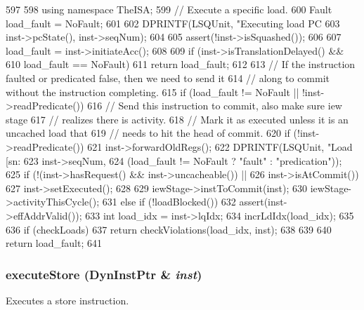 \begin{DoxyCode}
597 {
598     using namespace TheISA;
599     // Execute a specific load.
600     Fault load_fault = NoFault;
601 
602     DPRINTF(LSQUnit, "Executing load PC %
603             inst->pcState(), inst->seqNum);
604 
605     assert(!inst->isSquashed());
606 
607     load_fault = inst->initiateAcc();
608 
609     if (inst->isTranslationDelayed() &&
610         load_fault == NoFault)
611         return load_fault;
612 
613     // If the instruction faulted or predicated false, then we need to send it
614     // along to commit without the instruction completing.
615     if (load_fault != NoFault || !inst->readPredicate()) {
616         // Send this instruction to commit, also make sure iew stage
617         // realizes there is activity.
618         // Mark it as executed unless it is an uncached load that
619         // needs to hit the head of commit.
620         if (!inst->readPredicate())
621             inst->forwardOldRegs();
622         DPRINTF(LSQUnit, "Load [sn:%
623                 inst->seqNum,
624                 (load_fault != NoFault ? "fault" : "predication"));
625         if (!(inst->hasRequest() && inst->uncacheable()) ||
626             inst->isAtCommit()) {
627             inst->setExecuted();
628         }
629         iewStage->instToCommit(inst);
630         iewStage->activityThisCycle();
631     } else if (!loadBlocked()) {
632         assert(inst->effAddrValid());
633         int load_idx = inst->lqIdx;
634         incrLdIdx(load_idx);
635 
636         if (checkLoads)
637             return checkViolations(load_idx, inst);
638     }
639 
640     return load_fault;
641 }
\end{DoxyCode}
\hypertarget{classLSQUnit_aad78b8a37ee5c61e47df58dd39980340}{
\subsubsection[{executeStore}]{ executeStore ({\bf DynInstPtr} \& {\em inst})}}
\label{classLSQUnit_aad78b8a37ee5c61e47df58dd39980340}
Executes a store instruction. 


